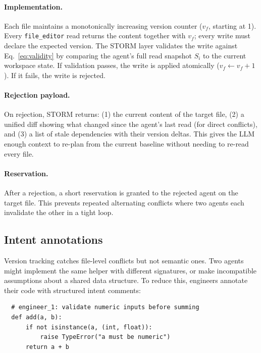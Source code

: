 \documentclass{article}
\begin{document}
\paragraph{Implementation.} Each file maintains a monotonically increasing version counter ($v_f$, starting at 1). Every \texttt{file\_editor} read returns the content together with $v_f$; every write must declare the expected version. The STORM layer validates the write against Eq.~\ref{eq:validity} by comparing the agent's full read snapshot $S_i$ to the current workspace state. If validation passes, the write is applied atomically ($v_f \leftarrow v_f + 1$). If it fails, the write is rejected.

\paragraph{Rejection payload.} On rejection, STORM returns: (1) the current content of the target file, (2) a unified diff showing what changed since the agent's last read (for direct conflicts), and (3) a list of stale dependencies with their version deltas. This gives the LLM enough context to re-plan from the current baseline without needing to re-read every file.

\paragraph{Reservation.} After a rejection, a short reservation is granted to the rejected agent on the target file. This prevents repeated alternating conflicts where two agents each invalidate the other in a tight loop.




\subsection{Intent annotations}
\label{sec:method-intent}

Version tracking catches file-level conflicts but not semantic ones. Two agents might implement the same helper with different signatures, or make incompatible assumptions about a shared data structure. To reduce this, engineers annotate their code with structured intent comments:

\begin{verbatim}
  # engineer_1: validate numeric inputs before summing
  def add(a, b):
      if not isinstance(a, (int, float)):
          raise TypeError("a must be numeric")
      return a + b
\end{verbatim}
\end{document}
